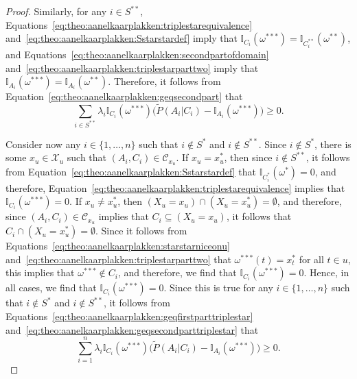 \documentclass[10pt,a4paper]{paper}
\theoremstyle{definition}
\newcommand{\states}{\mathcal{X}}
\newcommand{\ind}[1]{\mathbb{I}_{#1}}
\begin{document}
\begin{proof}
Similarly, for any $i\in S^{**}$, 
Equations~\eqref{eq:theo:aanelkaarplakken:triplestarequivalence} and~\eqref{eq:theo:aanelkaarplakken:Sstarstardef} imply that $\ind{C_i}(\omega^{***})=\ind{C_i^{**}}(\omega^{**})$,
and Equations~\eqref{eq:theo:aanelkaarplakken:secondpartofdomain} and~\eqref{eq:theo:aanelkaarplakken:triplestarparttwo} imply that $\ind{A_i}(\omega^{***})=\ind{A_i}(\omega^{**})$. Therefore, it follows from Equation~\eqref{eq:theo:aanelkaarplakken:geqsecondpart} that
\begin{equation}\label{eq:theo:aanelkaarplakken:geqsecondparttriplestar}
\sum_{i\in S^{**}}\lambda_i\ind{C_i}(\omega^{***})\bigl(\tilde{P}(A_i\vert C_i)-\ind{A_i}(\omega^{***})\bigr)
\geq0.
\end{equation}

Consider now any $i\in\{1,\dots,n\}$ such that $i\notin S^*$ and $i\notin S^{**}$. Since $i\notin S^*$, there is some $x_u\in\states_u$ such that $(A_i,C_i)\in\mathcal{C}_{x_u}$. If $x_u= x_u^*$, then since $i\notin S^{**}$, it follows from Equation~\eqref{eq:theo:aanelkaarplakken:Sstarstardef} that $\ind{C_i^*}(\omega^*)=0$, and therefore, Equation~\eqref{eq:theo:aanelkaarplakken:triplestarequivalence} implies that $\ind{C_i}(\omega^{***})=0$. 
If $x_u\neq x_u^*$, then $(X_u=x_u)\cap(X_u=x_u^*)=\emptyset$, and therefore, since $(A_i,C_i)\in\mathcal{C}_{x_u}$ implies that $C_i\subseteq (X_u=x_u)$, it follows that $C_i\cap (X_u=x_u^*)=\emptyset$. Since it follows from Equations~\eqref{eq:theo:aanelkaarplakken:starstarniceonu} and~\eqref{eq:theo:aanelkaarplakken:triplestarparttwo} that $\omega^{***}(t)=x_t^*$ for all $t\in u$, this implies that $\omega^{***}\notin C_i$, and therefore, we find that $\ind{C_i}(\omega^{***})=0$.
Hence, in all cases, we find that $\ind{C_i}(\omega^{***})=0$. Since this is true for any $i\in\{1,\dots,n\}$ such that $i\notin S^*$ and $i\notin S^{**}$, it follows from Equations~\eqref{eq:theo:aanelkaarplakken:geqfirstparttriplestar} and~\eqref{eq:theo:aanelkaarplakken:geqsecondparttriplestar} that
\begin{equation}\label{eq:theo:aanelkaarplakken:geqtotal}
\sum_{i=1}^n\lambda_i\ind{C_i}(\omega^{***})\bigl(\tilde{P}(A_i\vert C_i)-\ind{A_i}(\omega^{***})\bigr)\geq0.
\end{equation}


\end{proof}
\end{document}
